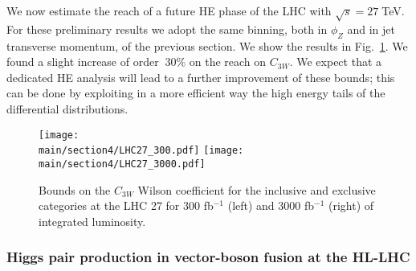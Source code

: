 \documentclass[../report.tex]{subfiles}
\providecommand{\main}{..}
\begin{document}
We now estimate the reach of a future HE phase of the LHC with
$\sqrt{s}=27\;$TeV. For these preliminary results we adopt the same binning, both in $\phi_Z$ and in jet transverse momentum, of the previous section. We show the results in Fig.~\ref{fig:LHC27}. We found a slight increase of order $~30\%$ on the reach on $C_{3W}$. We expect that a dedicated HE analysis will lead to a further improvement of these bounds; this can be done by exploiting in a more efficient way the high energy tails of the differential distributions.  


  \begin{figure}[h!]
\begin{center}
 \texttt{[image: \\main/section4/LHC27\_300.pdf]}{}\hspace{2cm}
 \texttt{[image: \\main/section4/LHC27\_3000.pdf]}{}
\end{center}
\caption{Bounds on the $C_{3W}$ Wilson coefficient for the inclusive and exclusive categories at the LHC 27 for 300 fb$^{-1}$ (left) and 3000 fb$^{-1}$ (right) of integrated luminosity.}
\label{fig:LHC27}
\end{figure}



\subsubsection{Higgs pair production in vector-boson fusion at the HL-LHC}


\end{document}
